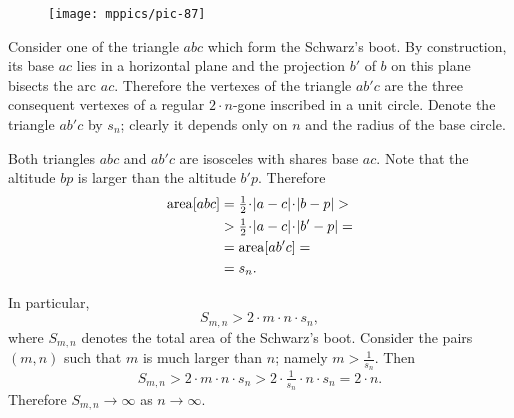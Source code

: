 {

\begin{wrapfigure}{o}{40 mm}
\centering
\texttt{[image: mppics/pic-87]}
\end{wrapfigure}

Consider one of the triangle $abc$ which form the Schwarz's boot.
By construction, its base $ac$ lies in a horizontal plane and the projection $b'$ of $b$ on this plane bisects the arc $ac$.
Therefore the vertexes of the triangle $ab'c$ are the three consequent vertexes of a regular $2\cdot n$-gone inscribed in a unit circle.
Denote the triangle $ab'c$ by $s_n$; clearly it depends only on $n$ and the radius of the base circle.


Both triangles $abc$ and $ab'c$ are isosceles with shares base $ac$.
Note that the altitude $bp$ is larger than the altitude $b'p$.
Therefore
\begin{align*}
\area [abc]&=\tfrac12\cdot |a-c|\cdot |b-p|>
\\
&>\tfrac12\cdot |a-c|\cdot |b'-p|=
\\
&=\area [ab'c]=
\\
&=s_n.
\end{align*}

}

In particular,
\[S_{m,n}>2\cdot m\cdot n\cdot s_n,\]
where $S_{m,n}$ denotes the total area of the Schwarz's boot.
Consider the pairs $(m,n)$ such that $m$ is much larger than $n$; namely $m>\tfrac1{s_n}$.
Then
\[S_{m,n}> 2\cdot  m\cdot  n\cdot  s_n>2\cdot  \tfrac1{s_n}\cdot  n\cdot  s_n=2\cdot n.\]
Therefore $S_{m,n}\to \infty$ as $n\to \infty$.
